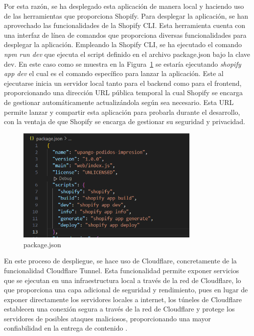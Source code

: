 \documentclass[12pt]{article}
\begin{document}
Por esta razón, se ha desplegado esta aplicación de manera local y haciendo uso de las herramientas que proporciona Shopify. Para desplegar la aplicación,
se han aprovechado las funcionalidades de la Shopify CLI. Esta herramienta cuenta con una interfaz de línea de comandos que proporciona diversas funcionalidades para desplegar la aplicación.
Empleando la Shopify CLI, se ha ejecutado el comando \textit{npm run dev} que ejecuta el script definido en el archivo package.json bajo la clave dev. En este caso como se muestra en la Figura~\ref{fig:scriptsPackageJson} se estaría ejecutando \textit{shopify app dev} el cual es el comando específico para lanzar la aplicación.
Este al ejecutarse inicia un servidor local tanto para el backend como para el frontend, proporcionando
una dirección URL pública temporal la cual Shopify se encarga de gestionar automáticamente actualizándola según sea necesario. Esta URL permite lanzar y compartir esta aplicación para probarla durante el desarrollo, con la ventaja de que 
Shopify se encarga de gestionar su seguridad y privacidad.

\begin{figure}[ht]
    \centering
    \includegraphics[width=0.8\textwidth]{imagenes/package.json.scripts.png}
    \caption{\label{fig:scriptsPackageJson}package.json}
    \vspace{\fill}
\end{figure}

En este proceso de despliegue, se hace uso de Cloudflare, concretamente de la funcionalidad Cloudflare Tunnel. Esta funcionalidad permite exponer servicios que se ejecutan
en una infraestructura local a través de la red de Cloudflare, lo que proporciona una capa adicional de seguridad y rendimiento, pues en lugar de 
exponer directamente los servidores locales a internet, los túneles de Cloudflare establecen una conexión segura a través de la red de Cloudflare y protege los
servidores de posibles ataques maliciosos, proporcionando una mayor confiabilidad en la entrega de contenido \cite{cloudflare}. 
\end{document}
